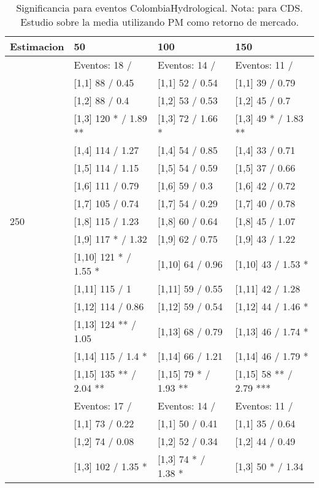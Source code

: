 \begin{table}

\caption{Significancia para eventos ColombiaHydrological. Nota: para CDS. Estudio sobre la media utilizando PM como retorno de mercado.}
\centering
\begin{tabular}[t]{llll}
\toprule
Estimacion & 50 & 100 & 150\\
\midrule
 & Eventos:  18 / & Eventos:  14 / & Eventos:  11 /\\
 & {}[1,1] 88  / 0.45 & {}[1,1] 52  / 0.54 & {}[1,1] 39  / 0.79\\
 & {}[1,2] 88  / 0.4 & {}[1,2] 53  / 0.53 & {}[1,2] 45  / 0.7\\
 & {}[1,3] 120 * / 1.89 ** & {}[1,3] 72  / 1.66 * & {}[1,3] 49 * / 1.83 **\\
 & {}[1,4] 114  / 1.27 & {}[1,4] 54  / 0.85 & {}[1,4] 33  / 0.71\\
\addlinespace
 & {}[1,5] 114  / 1.15 & {}[1,5] 54  / 0.59 & {}[1,5] 37  / 0.66\\
 & {}[1,6] 111  / 0.79 & {}[1,6] 59  / 0.3 & {}[1,6] 42  / 0.72\\
 & {}[1,7] 105  / 0.74 & {}[1,7] 54  / 0.29 & {}[1,7] 40  / 0.78\\
250 & {}[1,8] 115  / 1.23 & {}[1,8] 60  / 0.64 & {}[1,8] 45  / 1.07\\
 & {}[1,9] 117 * / 1.32 & {}[1,9] 62  / 0.75 & {}[1,9] 43  / 1.22\\
\addlinespace
 & {}[1,10] 121 * / 1.55 * & {}[1,10] 64  / 0.96 & {}[1,10] 43  / 1.53 *\\
 & {}[1,11] 115  / 1 & {}[1,11] 59  / 0.55 & {}[1,11] 42  / 1.28\\
 & {}[1,12] 114  / 0.86 & {}[1,12] 59  / 0.54 & {}[1,12] 44  / 1.46 *\\
 & {}[1,13] 124 ** / 1.05 & {}[1,13] 68  / 0.79 & {}[1,13] 46  / 1.74 *\\
 & {}[1,14] 115  / 1.4 * & {}[1,14] 66  / 1.21 & {}[1,14] 46  / 1.79 *\\
\addlinespace
 & {}[1,15] 135 ** / 2.04 ** & {}[1,15] 79 * / 1.93 ** & {}[1,15] 58 ** / 2.79 ***\\
 & Eventos:  17 / & Eventos:  14 / & Eventos:  11 /\\
 & {}[1,1] 73  / 0.22 & {}[1,1] 50  / 0.41 & {}[1,1] 35  / 0.64\\
 & {}[1,2] 74  / 0.08 & {}[1,2] 52  / 0.34 & {}[1,2] 44  / 0.49\\
 & {}[1,3] 102  / 1.35 * & {}[1,3] 74 * / 1.38 * & {}[1,3] 50 * / 1.34\\

\end{tabular}
\end{table}
